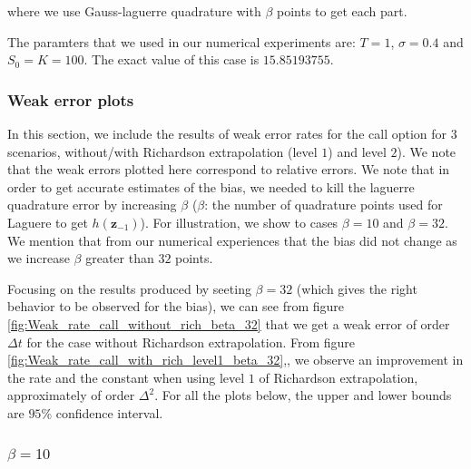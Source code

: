 \documentclass[11pt]{article}
\begin{document}
where we use Gauss-laguerre quadrature with $\beta$ points to get each part.

The paramters that we used in our numerical experiments are: $T=1$, $\sigma=0.4$ and $S_0=K=100$. The exact value of this case is $15.85193755$.











\subsubsection{Weak error plots} \label{sec:Weak error plots_call}



In this section, we include the results of weak error rates for  the call option for $3$ scenarios, without/with Richardson extrapolation (level $1$) and level $2$). We note that the weak errors plotted here correspond to relative errors.  We note that in order to get accurate estimates of the bias, we needed to kill the laguerre quadrature error by increasing $\beta$ ($\beta$: the number of quadrature points used for Laguere to get $h(\mathbf{z}_{-1})$). For illustration, we show to cases $\beta=10$ and $\beta=32$. We mention that from our numerical experiences that the bias did not change as we increase $\beta$ greater than $32$ points.

Focusing on the results produced by seeting $\beta=32$ (which gives the right behavior to be observed for the bias), we can see from figure \ref{fig:Weak_rate_call_without_rich_beta_32} that we get a weak error of order $\Delta t$ for the case without Richardson extrapolation. From figure \ref{fig:Weak_rate_call_with_rich_level1_beta_32},, we observe an improvement in the rate and the constant when using level $1$ of Richardson extrapolation, approximately of order $\Delta^2$. For all the plots below, the upper and lower bounds are $95\%$ confidence interval.



\subsubsection*{$\beta=10$}
\end{document}
